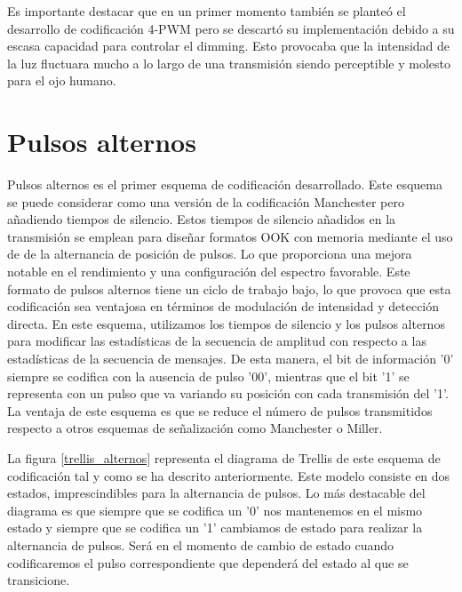 Es importante destacar que en un primer momento también se planteó el desarrollo de codificación 4-PWM pero se descartó su 
implementación debido a su escasa capacidad para controlar el dimming. Esto provocaba que la intensidad de la luz 
fluctuara mucho a lo largo de una transmisión siendo perceptible y molesto para el ojo humano.

\section{Pulsos alternos}
Pulsos alternos es el primer esquema de codificación desarrollado. Este esquema 
se puede considerar como una versión de la codificación Manchester pero
añadiendo tiempos de silencio. Estos tiempos de silencio añadidos en la transmisión
se emplean para diseñar formatos OOK con memoria mediante el uso de de la alternancia de
posición de pulsos. Lo que proporciona una mejora notable en el rendimiento y una 
configuración del espectro favorable. 
Este formato de pulsos alternos tiene un ciclo de trabajo bajo, lo que provoca que esta 
codificación sea ventajosa en términos de modulación de intensidad y detección directa. 
En este esquema, utilizamos los tiempos de silencio y los pulsos alternos para
modificar las estadísticas de la secuencia de amplitud con respecto a las estadísticas de 
la secuencia de mensajes. \cite{anto_alt}
\newpage
De esta manera, el bit de información '0' siempre se codifica con la ausencia de pulso 
'00', mientras que el bit '1' se representa con un pulso que va variando su posición con
cada transmisión del '1'. La ventaja de este esquema es que se reduce el número de pulsos 
transmitidos respecto a otros esquemas de señalización como Manchester o Miller.

La figura \ref{trellis_alternos} representa el diagrama de Trellis de este esquema de 
codificación tal y como se ha descrito anteriormente. Este modelo consiste en dos estados,
imprescindibles para la alternancia de pulsos. Lo más destacable del diagrama es que 
siempre que se codifica un '0' nos mantenemos en el mismo estado y siempre que se 
codifica un '1' cambiamos de estado para realizar la alternancia de pulsos. Será en el 
momento de cambio de estado cuando codificaremos el pulso correspondiente que dependerá 
del estado al que se transicione.

